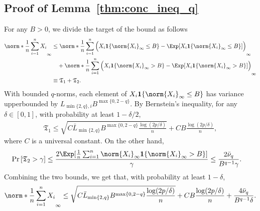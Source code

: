 \documentclass[aos]{imsart}
\begin{document}
\begin{appendix}
\subsection{Proof of Lemma~\ref{thm:conc_ineq_q}} \label{sec:pf_conc_ineq_q}

For any $B > 0$, we divide the target of the bound as follows
\begin{equation*}
\begin{aligned}
    \norm*{\frac{1}{n}\sum_{i=1}^n X_i}_\infty
    & \leq \norm*{ \frac{1}{n} \sum_{i=1}^n \Big( 
        X_i \mathbf{1}\{\norm{X_i}_\infty \leq B\} 
        - \Exp[X_i \mathbf{1}\{\norm{X_i}_\infty \leq B\} ] 
    \Big) }_\infty \\
    & \quad + \norm*{ \frac{1}{n} \sum_{i=1}^n \Big( 
        X_i \mathbf{1}\{\norm{X_i}_\infty > B\} 
        - \Exp[X_i \mathbf{1}\{\norm{X_i}_\infty > B\}] 
    \Big) }_\infty \\
    & \equiv \mathfrak{T}_1 + \mathfrak{T}_2.
\end{aligned}
\end{equation*}
With bounded $q$-norms, each element of $X_i \mathbf{1}\{\norm{X_i}_\infty \leq B\}$ has variance upperbounded by $L_{\min\{2, q\},i} B^{\max\{0, 2-q\}}$. By Bernstein's inequality, for any $\delta \in [0,1]$, with probability at least $1 - \delta/2$,  
\begin{equation*}
\begin{aligned}
    \mathfrak{T}_1 
    \leq \sqrt{ C \bar{L}_{\min\{2, q\}} B^{\max\{0, 2-q\}} \frac{\log(2p/\delta)}{n} }
    + C B \frac{\log(2p/\delta)}{n},
\end{aligned}
\end{equation*}
where $C$ is a universal constant. On the other hand,
\begin{equation*}
\begin{aligned}
    \Pr\left[ \mathfrak{T}_2 > \gamma \right]
    & \leq \frac{2 \Exp[ \frac{1}{n} \sum_{i=1}^n \norm{X_i}_\infty \mathbf{1}\{\norm{X_i}_\infty > B \}]}{\gamma} 
    \leq \frac{2 \bar{\nu}_{q}}{B^{q-1} \gamma}.
\end{aligned}
\end{equation*}
Combining the two bounds, we get that, with probability at least $1 - \delta$, 
\begin{equation*}
\begin{aligned}
    \norm*{\frac{1}{n}\sum_{i=1}^n X_i}_\infty
    \leq \sqrt{ C \bar{L}_{\min\{2, q\}} B^{\max\{0, 2-q\}} \frac{\log(2p/\delta)}{n} }
    + C B \frac{\log(2p/\delta)}{n}
    + \frac{4 \bar{\nu}_{q} }{B^{q-1} \delta}.

\end{aligned}
\end{equation*}
\end{appendix}
\end{document}
